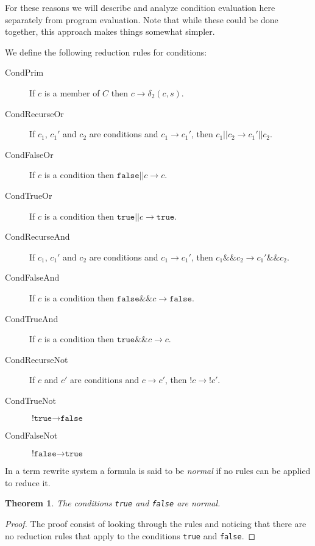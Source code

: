 \documentclass[11pt]{article}
\begin{document}
For these reasons we will describe and analyze condition evaluation here separately from program evaluation.  Note that while these could be done together, this approach makes things somewhat simpler.

We define the following reduction rules for conditions:

\begin{description}

\item[CondPrim] If $c$ is a member of $C$ then $c \rightarrow \delta_{2}(c, s)$.

\item[CondRecurseOr] If $c_{1}$, $c_{1}'$ and $c_{2}$ are conditions and $c_{1} \rightarrow c_{1}'$, then
$c_{1}\texttt{||}c_{2} \rightarrow c_{1}'\texttt{||}c_{2}$.
\item[CondFalseOr] If $c$ is a condition then $\texttt{false||} c \rightarrow c$.
\item[CondTrueOr] If $c$ is a condition then $\texttt{true||} c \rightarrow \texttt{true}$.

\item[CondRecurseAnd] If $c_{1}$, $c_{1}'$ and $c_{2}$ are conditions and $c_{1} \rightarrow c_{1}'$, then
$c_{1}\texttt{\&\&}c_{2} \rightarrow c_{1}'\texttt{\&\&}c_{2}$.
\item[CondFalseAnd] If $c$ is a condition then $\texttt{false\&\&} c \rightarrow \texttt{false}$.
\item[CondTrueAnd] If $c$ is a condition then $\texttt{true\&\&} c \rightarrow c$.

\item[CondRecurseNot] If $c$ and $c'$ are conditions and $c \rightarrow c'$, then
$\texttt{!}c \rightarrow \texttt{!}c'$.
\item[CondTrueNot] $\texttt{!true} \rightarrow \texttt{false}$
\item[CondFalseNot] $\texttt{!false} \rightarrow \texttt{true}$

\end{description}

In a term rewrite system a formula is said to be \emph{normal} if no rules can be applied to reduce it.

\newtheorem*{truefalsearenormal}{Theorem}
\begin{truefalsearenormal}
The conditions \texttt{true} and \texttt{false} are normal.
\end{truefalsearenormal}

\begin{proof}
The proof consist of looking through the rules and noticing that there are no reduction rules that apply to the conditions \texttt{true} and \texttt{false}.
\end{proof}
\end{document}
